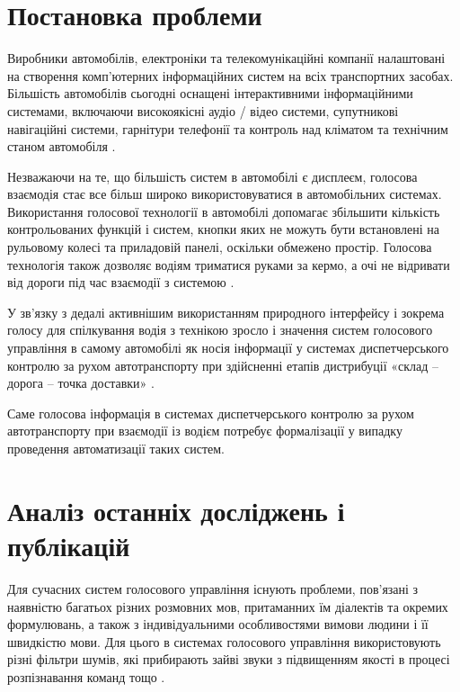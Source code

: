 \section{Постановка проблеми}
 
Виробники автомобілів, електроніки та телекомунікаційні компанії налаштовані на створення комп’ютерних інформаційних систем на всіх транспортних засобах. Більшість автомобілів сьогодні оснащені інтерактивними інформаційними системами, включаючи високоякісні аудіо / відео системи, супутникові навігаційні системи, гарнітури телефонії та контроль над кліматом та технічним станом автомобіля \cite{art1,Kravchenko_2009,Heisterkamp_2001}.

Незважаючи на те, що більшість систем в автомобілі є дисплеєм, голосова взаємодія стає все більш широко використовуватися в автомобільних системах. Використання голосової технології в автомобілі допомагає збільшити кількість контрольованих функцій і систем, кнопки яких не можуть бути встановлені на рульовому колесі та приладовій панелі, оскільки обмежено простір. Голосова технологія також дозволяє водіям триматися руками за кермо, а очі не відривати від дороги під час взаємодії з системою \cite{art1,Kravchenko_2009,Heisterkamp_2001}.

У зв’язку з дедалі активнішим використанням природного інтерфейсу і зокрема голосу для спілкування водія з технікою зросло і значення систем голосового управління в самому автомобілі як носія інформації у системах диспетчерського контролю за рухом автотранспорту при здійсненні етапів дистрибуції «склад – дорога – точка доставки» \cite{art1}.

Саме голосова інформація в системах диспетчерського контролю за рухом автотранспорту при взаємодії із водієм потребує формалізації у випадку проведення автоматизації таких систем.

\section{Аналіз останніх досліджень і публікацій}

Для сучасних систем голосового управління існують проблеми, пов’язані з наявністю багатьох різних розмовних мов, притаманних їм діалектів та окремих формулювань, а також з індивідуальними особливостями вимови людини і її швидкістю мови. Для цього в системах голосового управління використовують різні фільтри шумів, які прибирають зайві звуки з підвищенням якості в процесі розпізнавання команд тощо \cite{Kravchenko_2009,Heisterkamp_2001,Jonsson_2009}.

